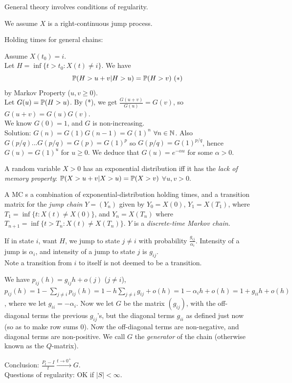\documentclass[a4paper]{article}
\begin{document}
General theory involves conditions of regularity.

We assume $X$ is a right-continuous jump process.

Holding times for general chains:

Assume $X(t_0) = i$.\\
Let $H=\inf\{t>t_0:X(t) \neq i\}$. We have $$\P(H>u+v|H>u) = \P(H>v) \ (*)$$ by Markov Property ($u,v \geq 0$).\\
Let $G(u) = \P(H>u)$. By (*), we get $\frac{G(u+v)}{G(u)} = G(v)$, so $G(u+v) = G(u)G(v)$.\\
We know $G(0) = 1$, and $G$ is non-increasing.\\
Solution: $G(n) = G(1)G(n-1) = G(1)^n$ $\forall n \in \N$. Also $G(p/q)... G(p/q) =G(p) = G(1)^p$ so $G(p/q) = G(1)^{p/q}$, hence $G(u) = G(1)^u$ for $u \geq 0$. We deduce that $G(u) = e^{-\alpha u}$ for some $\alpha>0$.

\begin{lemma}
A random variable $X>0$ has an exponential distribution iff it has the \emph{lack of memory property}: $\P(X>u+v|X>u) = \P(X>v)$ $\forall u,v > 0$.
\end{lemma}

A MC s a combination of exponential-distribution holding times, and a transition matrix for the \emph{jump chain} $Y=(Y_n)$ given by $Y_0 =X(0)$, $Y_1 = X(T_1)$, where $T_1 = \inf\{t:X(t) \neq X(0)\}$, and $Y_n = X(T_n)$ where $T_{n+1} = \inf \{t > T_n: X(t) \neq X(T_n)\}$. $Y$ is a \emph{discrete-time Markov chain.}

If in state $i$, want $H$, we jump to state $j\neq i$ with probability $\frac{g_{ij}}{\alpha_i}$. Intensity of a jump is $\alpha_i$, and intensity of a jump to state $j$ is $g_{ij}$.\\
Note a transition from $i$ to itself is not deemed to be a transition.

We have $p_{ij} (h) = g_{ij} h + o(j)$ ($j \neq i$), $p_{ij}(h) = 1- \sum_{j \neq i} p_{ij}(h) = 1-h\sum_{j \neq i} g_{ij} + o(h) = 1-\alpha_i h + o(h) = 1+g_{ii} h + o(h)$, where we let $g_{ii} = -\alpha_i$. Now we let $G$ be the matrix $(g_{ij})$, with the off-diagonal terms the previous $g_{ij}$'s, but the diagonal terms $g_{ii}$ as defined just now (so as to make row sums 0). Now the off-diagonal terms are non-negative, and diagonal terms are non-positive. We call $G$ the \emph{generator} of the chain (otherwise known as the $Q$-matrix).

Conclusion: $\frac{P_t - I}{t} \xrightarrow{t \to 0^+} G$.\\
Questions of regularity: OK if $|S| < \infty$.
\end{document}
